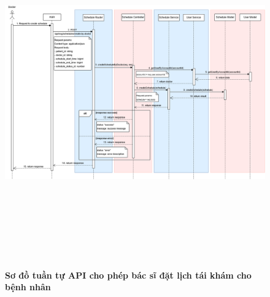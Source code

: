 \begin{figure}[H]
	\centering
	\includegraphics[width=15cm,height=15cm]{Images/api_sequence/schedule/createScheduleByDoctor.drawio.png}
	\caption[Sơ đồ tuần tự API cho phép bác sĩ đặt lịch tái khám cho bệnh nhân]{\bfseries \fontsize{12pt}{0pt}\selectfont Sơ đồ tuần tự API cho phép bác sĩ đặt lịch tái khám cho bệnh nhân}
	\label{sequence_diagram_create_schedule_by_doctor}
\end{figure}

